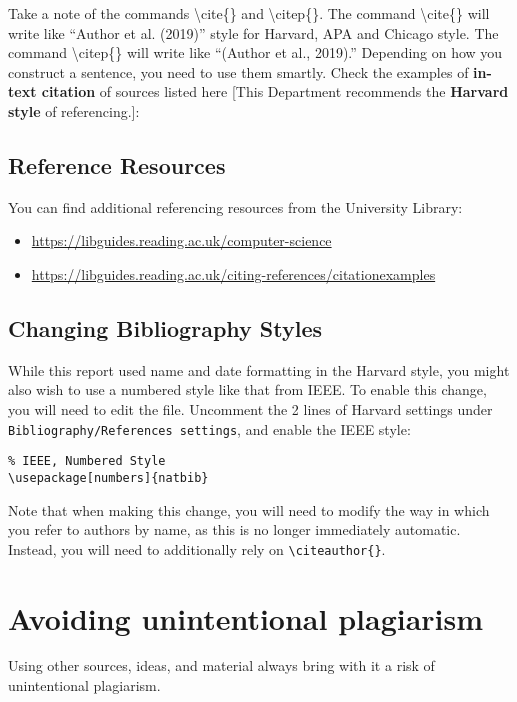 Take a note of the commands \textbackslash cite\{\} and
\textbackslash citep\{\}. The command \textbackslash cite\{\} will
write like ``Author et al. (2019)'' style for Harvard, APA and
Chicago style. The command \textbackslash citep\{\} will write like
``(Author et al., 2019).'' Depending on how you construct a sentence,
you need to use them smartly. Check the examples of \textbf{in-text
citation} of sources listed here [This Department recommends the
\textbf{Harvard style} of referencing.]:

\subsection{Reference Resources}\label{subsec:reflinks}
You can find additional referencing resources from the University Library:
\begin{itemize}
  \item \url{https://libguides.reading.ac.uk/computer-science}
  \item \url{https://libguides.reading.ac.uk/citing-references/citationexamples}
\end{itemize}

\subsection{Changing Bibliography Styles}
While this report used name and date formatting in the Harvard style,
you might also wish to use a numbered style like that from IEEE.  To
enable this change, you will need to edit the 
file.  Uncomment the 2 lines of Harvard settings under
\texttt{Bibliography/References settings}, and enable the IEEE style:

\begin{verbatim}
% IEEE, Numbered Style
\usepackage[numbers]{natbib}

\end{verbatim}

Note that when making this change, you will need to modify the way in
which you refer to authors by name, as this is no longer immediately
automatic.  Instead, you will need to additionally rely on \verb|\citeauthor{}|.

\section{Avoiding unintentional plagiarism}
Using other sources, ideas, and material always bring with it a risk
of unintentional plagiarism.

